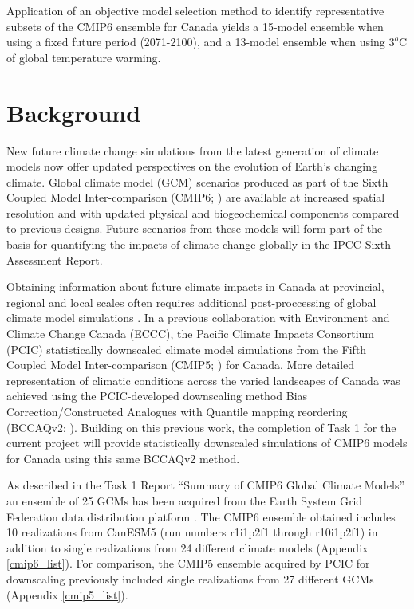 \documentclass[]{scrartcl}
\begin{document}
Application of an objective model selection method to identify representative subsets of the CMIP6 ensemble for Canada yields a 15-model ensemble when using a fixed future period (2071-2100), and a 13-model ensemble when using $3^o$C of global temperature warming.

\section{Background}
New future climate change simulations from the latest generation of climate models now offer updated perspectives on the evolution of Earth's changing climate. Global climate model (GCM) scenarios produced as part of the Sixth Coupled Model Inter-comparison (CMIP6; \citealt{eyring_overview_2016}) are available at increased spatial resolution and with updated physical and biogeochemical components compared to previous designs. Future scenarios from these models will form part of the basis for quantifying the impacts of climate change globally in the IPCC Sixth Assessment Report. 

Obtaining information about future climate impacts in Canada at provincial, regional and local scales often requires additional post-proccessing of global climate model simulations \citep{zhang_change_2019}. In a previous collaboration with Environment and Climate Change Canada (ECCC), the Pacific Climate Impacts Consortium (PCIC) statistically downscaled climate model simulations from the Fifth Coupled Model Inter-comparison (CMIP5; \citealt{taylor_overview_2011}) for Canada. More detailed representation of climatic conditions across the varied landscapes of Canada was achieved using the PCIC-developed downscaling method Bias Correction/Constructed Analogues with Quantile mapping reordering (BCCAQv2; \citealt{werner_hydrologic_2015}). Building on this previous work, the completion of Task 1 for the current project will provide statistically downscaled simulations of CMIP6 models for Canada using this same BCCAQv2 method.

As described in the Task 1 Report ``Summary of CMIP6 Global Climate Models'' an ensemble of 25 GCMs has been acquired from the Earth System Grid Federation data distribution platform \citep{williams_earth_2009}. The CMIP6 ensemble obtained includes 10 realizations from CanESM5 (run numbers r1i1p2f1 through r10i1p2f1) in addition to single realizations from 24 different climate models (Appendix \ref{cmip6_list}). For comparison, the CMIP5 ensemble acquired by PCIC for downscaling previously included single realizations from 27 different GCMs (Appendix \ref{cmip5_list}). 
\end{document}
